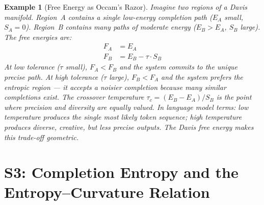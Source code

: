 \documentclass[11pt,letterpaper]{article}
\newtheorem{example}[conjecture]{Example}
\begin{document}
\begin{example}[Free Energy as Occam's Razor]
Imagine two regions of a Davis manifold. Region~A contains a single 
low-energy completion path ($E_A$ small, $S_A = 0$). Region~B contains many 
paths of moderate energy ($E_B > E_A$, $S_B$ large). The free energies are:
\begin{align}
    F_A &= E_A \\
    F_B &= E_B - \tau \cdot S_B
\end{align}
At low tolerance ($\tau$ small), $F_A < F_B$ and the system commits to the 
unique precise path. At high tolerance ($\tau$ large), $F_B < F_A$ and the 
system prefers the entropic region --- it accepts a noisier completion 
because many similar completions exist. The crossover temperature 
$\tau_c = (E_B - E_A)/S_B$ is the point where precision and diversity are 
equally valued. In language model terms: low temperature produces the single 
most likely token sequence; high temperature produces diverse, creative, 
but less precise outputs. The Davis free energy makes this trade-off 
geometric.
\end{example}

\newpage
\section{S3: Completion Entropy and the Entropy--Curvature Relation}
\end{document}
